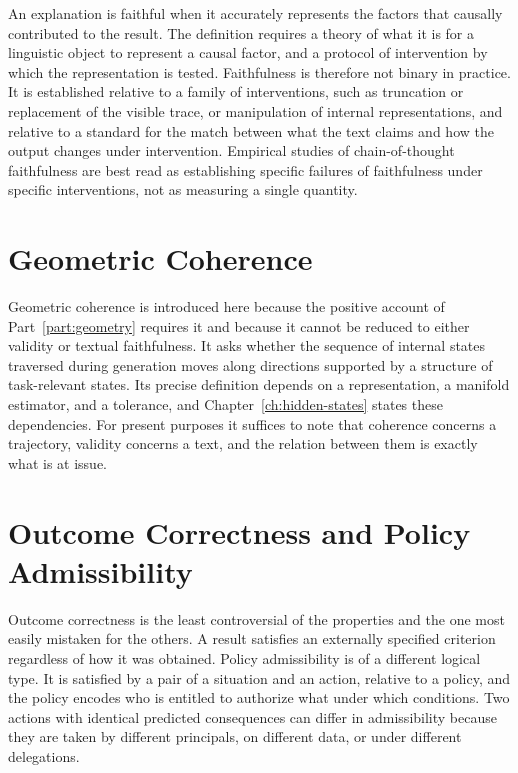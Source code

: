 An explanation is faithful when it accurately represents the factors that causally contributed to the result. The definition requires a theory of what it is for a linguistic object to represent a causal factor, and a protocol of intervention by which the representation is tested. Faithfulness is therefore not binary in practice. It is established relative to a family of interventions, such as truncation or replacement of the visible trace, or manipulation of internal representations, and relative to a standard for the match between what the text claims and how the output changes under intervention. Empirical studies of chain-of-thought faithfulness \cite{turpin2023,lanham2023} are best read as establishing specific failures of faithfulness under specific interventions, not as measuring a single quantity.

\section{Geometric Coherence}

Geometric coherence is introduced here because the positive account of Part~\ref{part:geometry} requires it and because it cannot be reduced to either validity or textual faithfulness. It asks whether the sequence of internal states traversed during generation moves along directions supported by a structure of task-relevant states. Its precise definition depends on a representation, a manifold estimator, and a tolerance, and Chapter~\ref{ch:hidden-states} states these dependencies. For present purposes it suffices to note that coherence concerns a trajectory, validity concerns a text, and the relation between them is exactly what is at issue.

\section{Outcome Correctness and Policy Admissibility}

Outcome correctness is the least controversial of the properties and the one most easily mistaken for the others. A result satisfies an externally specified criterion regardless of how it was obtained. Policy admissibility is of a different logical type. It is satisfied by a pair of a situation and an action, relative to a policy, and the policy encodes who is entitled to authorize what under which conditions. Two actions with identical predicted consequences can differ in admissibility because they are taken by different principals, on different data, or under different delegations.

